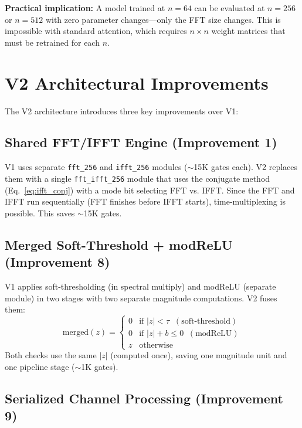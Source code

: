 \documentclass[11pt,a4paper]{article}
\theoremstyle{definition}
\theoremstyle{remark}
\newcommand{\abs}[1]{\left\lvert#1\right\rvert}
\begin{document}
\textbf{Practical implication:} A model trained at $n=64$ can be evaluated at
$n=256$ or $n=512$ with zero parameter changes---only the FFT size changes.
This is impossible with standard attention, which requires $n \times n$ weight
matrices that must be retrained for each $n$.

\section{V2 Architectural Improvements}

The V2 architecture introduces three key improvements over V1:

\subsection{Shared FFT/IFFT Engine (Improvement 1)}

V1 uses separate \texttt{fft\_256} and \texttt{ifft\_256} modules ($\sim$15K gates
each). V2 replaces them with a single \texttt{fft\_ifft\_256} module that uses
the conjugate method (Eq.~\ref{eq:ifft_conj}) with a mode bit selecting FFT vs.
IFFT. Since the FFT and IFFT run sequentially (FFT finishes before IFFT starts),
time-multiplexing is possible. This saves $\sim$15K gates.

\subsection{Merged Soft-Threshold + modReLU (Improvement 8)}

V1 applies soft-thresholding (in spectral multiply) and modReLU (separate module)
in two stages with two separate magnitude computations. V2 fuses them:
\begin{equation}
  \text{merged}(z) = \begin{cases}
    0 & \text{if } \abs{z} < \tau \;\;(\text{soft-threshold}) \\
    0 & \text{if } \abs{z} + b \leq 0 \;\;(\text{modReLU}) \\
    z & \text{otherwise}
  \end{cases}
\end{equation}
Both checks use the same $\abs{z}$ (computed once), saving one magnitude unit
and one pipeline stage ($\sim$1K gates).

\subsection{Serialized Channel Processing (Improvement 9)}
\end{document}
